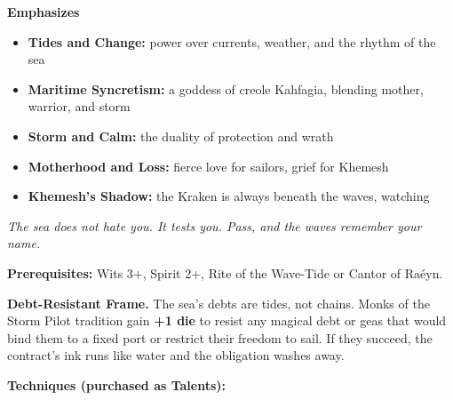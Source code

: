 \noindent\textbf{Emphasizes}
\begin{itemize}
  \item \textbf{Tides and Change:} power over currents, weather, and the rhythm of the sea
  \item \textbf{Maritime Syncretism:} a goddess of creole Kahfagia, blending mother, warrior, and storm
  \item \textbf{Storm and Calm:} the duality of protection and wrath
  \item \textbf{Motherhood and Loss:} fierce love for sailors, grief for Khemesh
  \item \textbf{Khemesh's Shadow:} the Kraken is always beneath the waves, watching
\end{itemize}

\begin{tcolorbox}[colback=black!5,colframe=blue!50!black,title=\textbf{Storm Pilot (Raéyn)},breakable]
  \emph{The sea does not hate you. It tests you. Pass, and the waves remember your name.}

  \vspace{2mm}
  \noindent\textbf{Prerequisites:} Wits 3+, Spirit 2+, Rite of the Wave-Tide or Cantor of Raéyn.

  \vspace{2mm}
  \noindent\textbf{Debt-Resistant Frame.} The sea's debts are tides, not chains. Monks of the Storm Pilot tradition gain \textbf{+1 die} to resist any magical debt or geas that would bind them to a fixed port or restrict their freedom to sail. If they succeed, the contract's ink runs like water and the obligation washes away.

  \vspace{2mm}
  \noindent\textbf{Techniques (purchased as Talents):}


\end{tcolorbox}
